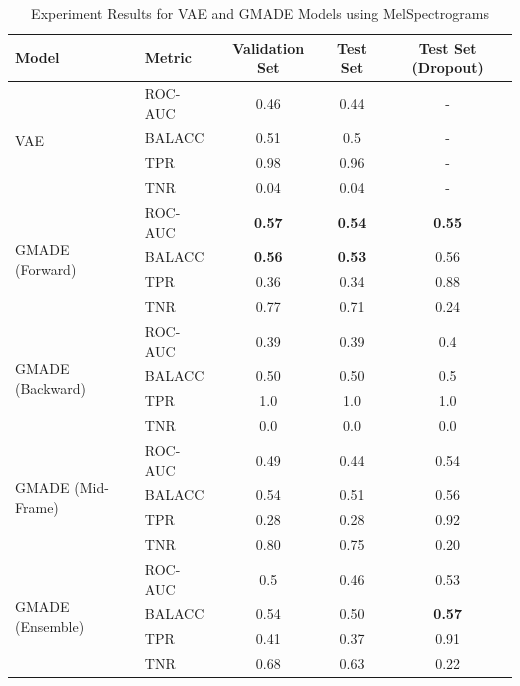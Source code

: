 \begin{table}[h!]
    \centering
    \caption{Experiment Results for VAE and GMADE Models using MelSpectrograms}
    \begin{tabular}{|l|l|c|c|c|}
    \hline
    \textbf{Model} & \textbf{Metric} & \textbf{Validation Set} & \textbf{Test Set} & \textbf{Test Set (Dropout)} \\
    \hline
    \multirow{4}{*}{VAE} 
    & ROC-AUC & 0.46 & 0.44 & - \\
    & BALACC  & 0.51 & 0.5 & - \\
    & TPR     & 0.98 & 0.96 & - \\
    & TNR     & 0.04 & 0.04 & - \\
    \hline
    \multirow{4}{*}{GMADE (Forward)}
    & ROC-AUC & \textbf{0.57} & \textbf{0.54} & \textbf{0.55} \\
    & BALACC  & \textbf{0.56} & \textbf{0.53} & 0.56 \\
    & TPR     & 0.36 & 0.34 & 0.88 \\
    & TNR     & 0.77 & 0.71 & 0.24 \\
    \hline
    \multirow{4}{*}{GMADE (Backward)}
    & ROC-AUC & 0.39 & 0.39 & 0.4 \\
    & BALACC  & 0.50 & 0.50 & 0.5 \\
    & TPR     & 1.0 & 1.0 & 1.0 \\
    & TNR     & 0.0 & 0.0 & 0.0 \\
    \hline
    \multirow{4}{*}{GMADE (Mid-Frame)}
    & ROC-AUC & 0.49 & 0.44 & 0.54 \\
    & BALACC  & 0.54 & 0.51 & 0.56 \\
    & TPR     & 0.28 & 0.28 & 0.92 \\
    & TNR     & 0.80 & 0.75 & 0.20 \\
    \hline
    \multirow{4}{*}{GMADE (Ensemble)}
    & ROC-AUC & 0.5 & 0.46 & 0.53 \\
    & BALACC  & 0.54 & 0.50 & \textbf{0.57} \\
    & TPR     & 0.41 & 0.37 & 0.91 \\
    & TNR     & 0.68 & 0.63 & 0.22 \\
    \hline
    \end{tabular}
\end{table}

